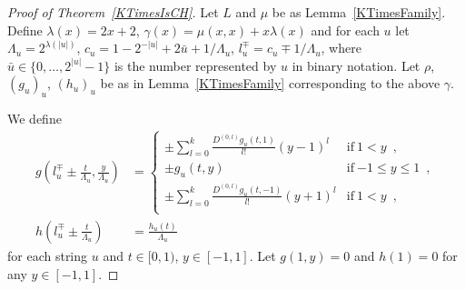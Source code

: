 \documentclass[12pt,a4paper]{article}
\theoremstyle{definition}
\theoremstyle{remark}
\newcommand{\D}{D}
\begin{document}
\begin{proof}[Proof of Theorem~\ref{KTimesIsCH}]
Let $L$ and $\mu$ be as Lemma~\ref{KTimesFamily}.
Define
$
  \lambda(x) = 2x + 2
$, $
  \gamma(x) = \mu(x, x) + x \lambda(x)
$
and for each $u$ let
$
 \Lambda_u = 2^{\lambda(|u|)}
$, $
 c_u = 1-{2^{-|u|}}+{2\bar{u}+1}/{\Lambda_u}
$, $
 l_u^\mp = c_u\mp{1}/{\Lambda_u}
$,
 where $\bar u \in \{0, \dots, 2^{|u|} - 1\}$ is the number represented by $u$ in binary notation.
Let $\rho$, $(g_u)_u$, $(h_u)_u$ be as in Lemma~\ref{KTimesFamily} 
corresponding to the above $\gamma$.

We define
 \begin{align} \label{eq:g}
 g \left(l^\mp_u \pm \frac{t}{\Lambda_u}, \frac{y}{\Lambda_u}\right)
  &= \begin{cases}
      \pm \displaystyle \sum_{l=0}^k \frac{\D^{(0,l)}g_u(t,1)}{l!} (y-1)^l 
      &  \text{if} \ 1<y \enspace , \\
      \pm g_u(t, y)      & \text{if} \ {-1} \le y \le 1 \enspace , \\
      \pm \displaystyle \sum_{l=0}^k \frac{\D^{(0,l)}g_u(t,-1)}{l!} (y+1)^l  
      &  \text{if} \ 1<y \enspace , \\
    \end{cases} 
  \\
 h \left( l^\mp_u \pm \frac{t}{\Lambda_u} \right) 
  & = \frac{h_u(t)}{\Lambda_u}
\end{align}
for each string $u$ and $t \in [0,1)$, $y \in [-1, 1]$.
Let $g(1,y) = 0$ and $h(1) = 0$ for any $y \in [-1,1]$.


\end{proof}
\end{document}
